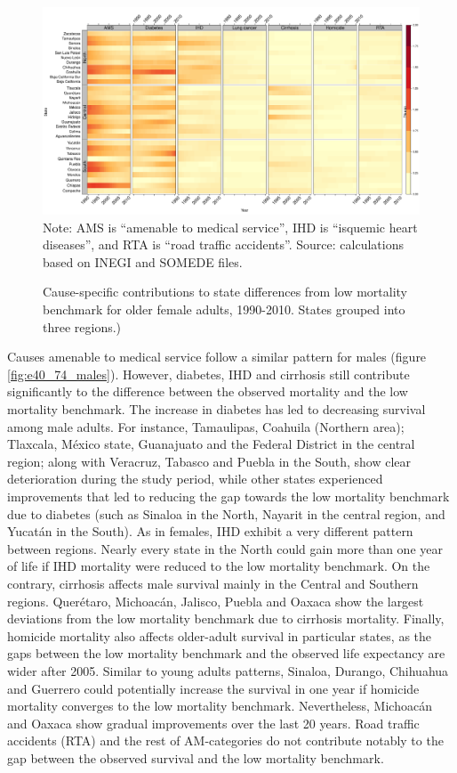 \documentclass[11.5pt]{article}
\begin{document}
\begin{spacing}{1.5}
\begin{figure}[h]
\centering
\caption{Cause-specific contributions to state differences from low mortality benchmark for older female adults, 1990-2010. States grouped into three regions.)}
\label{fig:e40_74_females}
\includegraphics[scale=.33]{Figures/Adult_Female_heatmap.pdf}
Note: AMS is ``amenable to medical service'', IHD is ``isquemic heart diseases'', and RTA is ``road traffic accidents''. Source: calculations based on INEGI and SOMEDE files. \end{figure}

Causes amenable to medical service follow a similar pattern for males (figure  \ref{fig:e40_74_males}). However, diabetes, IHD and cirrhosis still contribute significantly to the difference between the observed mortality and the low mortality benchmark. The increase in diabetes has led to decreasing survival among male adults. For instance,  Tamaulipas, Coahuila (Northern area); Tlaxcala, M\'exico state, Guanajuato and the Federal District in the central region; along with Veracruz, Tabasco and Puebla in the South, show clear deterioration during the study period, while other states experienced improvements that led to reducing the gap towards the low mortality benchmark due to diabetes (such as Sinaloa in the North, Nayarit in the central region, and Yucat\'an in the South). As in females, IHD exhibit a very different pattern between regions. Nearly every state in the North could gain more than one year of life if IHD mortality were reduced to the low mortality benchmark. On the contrary, cirrhosis affects male survival mainly in the Central and Southern regions. Quer\'etaro, Michoac\'an, Jalisco, Puebla and Oaxaca show the largest deviations from the low mortality benchmark due to cirrhosis mortality. Finally, homicide mortality also affects older-adult survival in particular states, as the gaps between the low mortality benchmark and the observed life expectancy are wider after 2005. Similar to young adults patterns, Sinaloa, Durango, Chihuahua and Guerrero could potentially increase the survival in one year if homicide mortality converges to the low mortality benchmark. Nevertheless,  Michoac\'an and Oaxaca show gradual improvements over the last 20 years. Road traffic accidents (RTA) and the rest of AM-categories do not contribute notably to the gap between the observed survival and the low mortality benchmark. 





\end{spacing}
\end{document}

